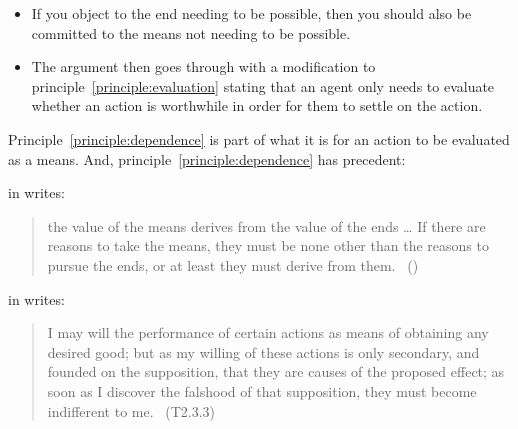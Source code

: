 \documentclass[10pt]{article}
\begin{document}
\begin{itemize}
\item If you object to the end needing to be possible, then you should also be committed to the means not needing to be possible.
\item The argument then goes through with a modification to principle~\ref{principle:evaluation} stating that an agent only needs to evaluate whether an action is worthwhile in order for them to settle on the action.
\end{itemize}









Principle~\ref{principle:dependence} is part of what it is for an action to be evaluated as a means.
And, principle~\ref{principle:dependence} has precedent:

\citeauthor{Raz:2005aa} in  writes:
\begin{quote}
    the value of the means derives from the value of the ends \dots
    If there are reasons to take the means, they must be none other than the reasons to pursue the ends, or at least they must derive from them.\nolinebreak
  \mbox{ }\hfill(\cite[2]{Raz:2005aa})
\end{quote}

\citeauthor{Hume:2011aa} in  writes:

\begin{quote}
  I may will the performance of certain actions as means of obtaining any desired good; but as my willing of these actions is only secondary, and founded on the supposition, that they are causes of the proposed effect; as soon as I discover the falshood of that supposition, they must become indifferent to me.\nolinebreak
  \mbox{ }\hfill\mbox{\hfill(T2.3.3)}
\end{quote}
\end{document}
